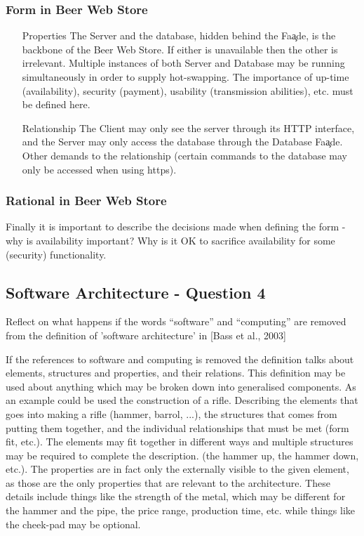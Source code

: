 \subsubsection{Form in Beer Web Store}
\begin{itemize}
    \item[Properties] The Server and the database, hidden behind the Fa\c ade, is the backbone of the Beer Web Store. If either is unavailable then the other is irrelevant. Multiple instances of both Server and Database may be running simultaneously in order to supply hot-swapping. The importance of up-time (availability), security (payment), usability (transmission abilities), etc. must be defined here.
    \item[Relationship] The Client may only see the server through its
 HTTP interface, and the Server may only access the database through the Database Fa\c ade. Other demands to the relationship (certain commands to the database may only be accessed when using https).
\end{itemize}

\subsubsection{Rational in Beer Web Store}

Finally it is important to describe the decisions made when defining the form - why is availability important? Why is it OK to sacrifice availability for some (security) functionality.

\subsection{Software Architecture - Question 4}

\begin{question}
Reflect on what happens if the words ``software'' and
``computing'' are removed from the definition of 'software
architecture' in [Bass et al., 2003]
\end{question}

If the references to software and computing is removed the definition talks about elements, structures and properties, and their relations. This definition may be used about anything which may be broken down into generalised components. As an example could be used the construction of a rifle. Describing the elements that goes into making a rifle (hammer, barrol, ...), the structures that comes from putting them together, and the individual relationships that must be met (form fit, etc.). The elements may fit together in different ways and multiple structures may be required to complete the description. (the hammer up, the hammer down, etc.). The properties are in fact only the externally visible to the given element, as those are the only properties that are relevant to the architecture. These details include things like the strength of the metal, which may be different for the hammer and the pipe, the price range, production time, etc. while things like the cheek-pad may be optional.

